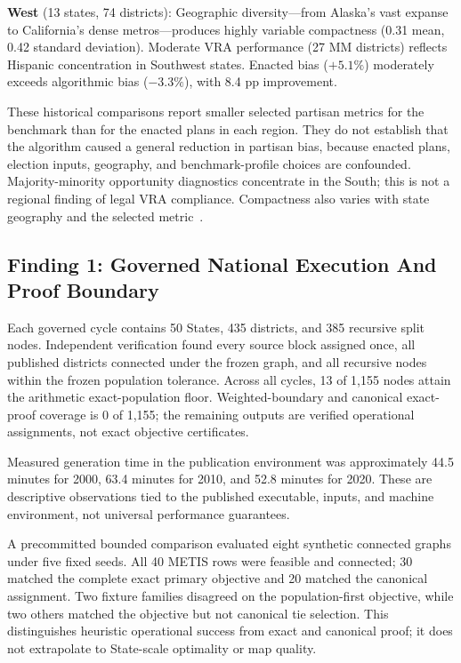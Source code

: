 \textbf{West} (13 states, 74 districts): Geographic diversity---from Alaska's vast expanse to California's dense metros---produces highly variable compactness (0.31 mean, 0.42 standard deviation). Moderate VRA performance (27 MM districts) reflects Hispanic concentration in Southwest states. Enacted bias ($+5.1\%$) moderately exceeds algorithmic bias ($-3.3\%$), with 8.4 pp improvement.

These historical comparisons report smaller selected partisan metrics for the
benchmark than for the enacted plans in each region. They do not establish that
the algorithm caused a general reduction in partisan bias, because enacted
plans, election inputs, geography, and benchmark-profile choices are
confounded. Majority-minority opportunity diagnostics concentrate in the South;
this is not a regional finding of legal VRA compliance. Compactness also varies
with state geography and the selected metric~\cite{deluca2026compactness}.

\subsection{Finding 1: Governed National Execution And Proof Boundary}

Each governed cycle contains 50 States, 435 districts, and 385 recursive split
nodes. Independent verification found every source block assigned once, all
published districts connected under the frozen graph, and all recursive nodes
within the frozen population tolerance. Across all cycles, 13 of 1,155 nodes
attain the arithmetic exact-population floor. Weighted-boundary and canonical
exact-proof coverage is 0 of 1,155; the remaining outputs are verified
operational assignments, not exact objective certificates.

Measured generation time in the publication environment was approximately
44.5 minutes for 2000, 63.4 minutes for 2010, and 52.8 minutes for 2020. These
are descriptive observations tied to the published executable, inputs, and
machine environment, not universal performance guarantees.

A precommitted bounded comparison evaluated eight synthetic connected graphs
under five fixed seeds. All 40 METIS rows were feasible and connected;
30 matched the complete exact primary objective and 20 matched the canonical
assignment. Two fixture families disagreed on the population-first objective,
while two others matched the objective but not canonical tie selection. This
distinguishes heuristic operational success from exact and canonical proof; it
does not extrapolate to State-scale optimality or map quality.

